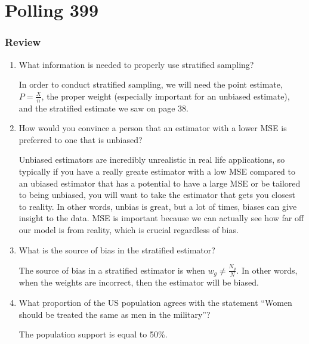 \chapter{Polling 399}\label{ch:polling399}




\subsection*{Review}
\begin{enumerate}

 \item What information is needed to properly use stratified sampling?
\begin{solution}
In order to conduct stratified sampling, we will need the point estimate, $P = \frac{X}{n}$, the proper weight (especially important for an unbiased estimate), and the stratified estimate we saw on page 38. 
\end{solution}

 \item How would you convince a person that an estimator with a lower MSE is preferred to one that is unbiased?
\begin{solution}
Unbiased estimators are incredibly unrealistic in real life applications, so typically if you have a really greate estimator with a low MSE compared to an ubiased estimator that has a potential to have a large MSE or be tailored to being unbiased, you will want to take the estimator that gets you closest to reality. In other words, unbias is great, but a lot of times, biases can give insight to the data. MSE is important because we can actually see how far off our model is from reality, which is crucial regardless of bias.
\end{solution}

 \item What is the source of bias in the stratified estimator?
\begin{solution}
The source of bias in a stratified estimator is when $w_{g} \neq \frac{N_{g}}{N}$. In other words, when the weights are incorrect, then the estimator will be biased.
\end{solution}

 \item What proportion of the US population agrees with the statement ``Women should be treated the same as men in the military''?
\begin{solution}
The population support is equal to 50\%.
\end{solution}


\end{enumerate}
